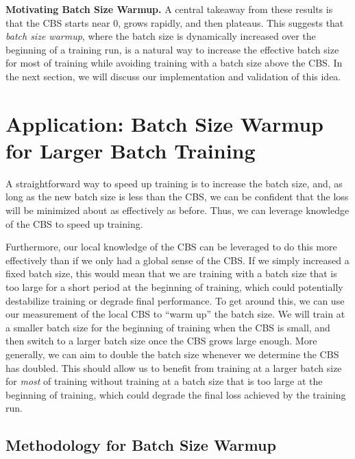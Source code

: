 \documentclass{article}
\renewcommand{\paragraph}[1]{\noindent \textbf{#1}}
\begin{document}
\paragraph{Motivating Batch Size Warmup.}
A central takeaway from these results is that the CBS starts near 0, grows rapidly, and then plateaus.
This suggests that \emph{batch size warmup}, where the batch size is dynamically increased over the beginning of a training run, is a natural way to increase the effective batch size for most of training while avoiding training with a batch size above the CBS.
In the next section, we will discuss our implementation and validation of this idea.

\section{Application: Batch Size Warmup for Larger Batch Training} \label{sec:batch-size-warmup}

A straightforward way to speed up training is to increase the batch size, and, as long as the new batch size is less than the CBS, we can be confident that the loss will be minimized about as effectively as before.
Thus, we can leverage knowledge of the CBS to speed up training.

Furthermore, our local knowledge of the CBS can be leveraged to do this more effectively than if we only had a global sense of the CBS.
If we simply increased a fixed batch size, this would mean that we are training with a batch size that is too large for a short period at the beginning of training, which could potentially destabilize training or degrade final performance. To get around this, we can use our measurement of the local CBS to ``warm up'' the batch size.
We will train at a smaller batch size for the beginning of training when the CBS is small, and then switch to a larger batch size once the CBS grows large enough.
More generally, we can aim to double the batch size whenever we determine the CBS has doubled.
This should allow us to benefit from training at a larger batch size for \emph{most} of training without training at a batch size that is too large at the beginning of training, which could degrade the final loss achieved by the training run.

\subsection{Methodology for Batch Size Warmup} \label{sec:batch-size-warmup-method}
\end{document}
